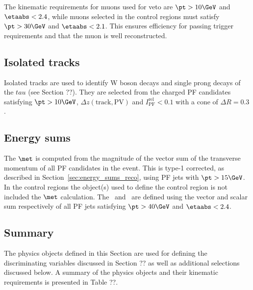 The kinematic requirements for muons used for veto are $\pt > 10\GeV$ and $\etaabs < 2.4$, while muons 
selected in the control regions must satisfy $\pt > 30\GeV$ and $\etaabs < 2.1$. This ensures efficiency
for passing trigger requirements and that the muon is well reconstructed.


\subsection{Isolated tracks}

Isolated tracks are used to identify W boson decays and single prong decays of the $tau$ (see Section ??). 
They are selected from the charged PF candidates satisfying $\pt > 10\GeV$, $\Delta z(\text{track},\text{PV})$ and 
$I_{\text{PF}}^{\text{rel}} < 0.1$ with a cone of $\Delta R = 0.3$.

\subsection{Energy sums}

The $\met$ is computed from the magnitude of the vector sum of the transverse momentum of all PF candidates in
the event. This is type-1 corrected, as described in Section~\ref{sec:energy_sums_reco}, 
using PF jets with $\pt > 15\GeV$. In the control regions the object(s) used to define
the control region is not included the $\met$ calculation. The \mht~and \scalht~are defined
using the vector and scalar sum respectively of all PF jets satisfying $\pt > 40\GeV$ and $\etaabs < 2.4$.

\subsection{Summary}

The physics objects defined in this Section are used for defining the
discriminating variables discussed in Section ?? as well as additional selections
discussed below. A summary of the physics objects and their
kinematic requirements is presented in Table ??.

